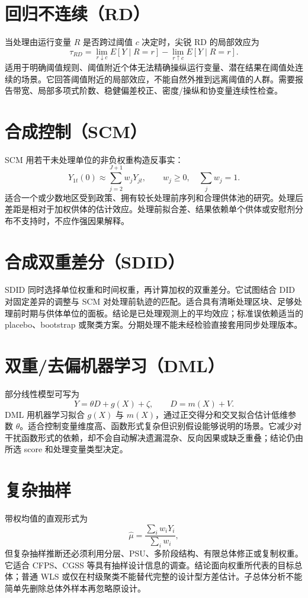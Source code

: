\documentclass[UTF8]{ctexart}
\begin{document}
\section{回归不连续（RD）}

当处理由运行变量 $R$ 是否跨过阈值 $c$ 决定时，尖锐 RD 的局部效应为
\[
\tau_{RD}=\lim_{r\downarrow c}E[Y\mid R=r]-\lim_{r\uparrow c}E[Y\mid R=r].
\]
适用于明确阈值规则、阈值附近个体无法精确操纵运行变量、潜在结果在阈值处连续的场景。它回答阈值附近的局部效应，不能自然外推到远离阈值的人群。需要报告带宽、局部多项式阶数、稳健偏差校正、密度/操纵和协变量连续性检查。

\section{合成控制（SCM）}

SCM 用若干未处理单位的非负权重构造反事实：
\[
Y_{1t}(0)\approx\sum_{j=2}^{J+1}w_jY_{jt},\qquad w_j\geq0,\quad\sum_jw_j=1.
\]
适合一个或少数地区受到政策、拥有较长处理前序列和合理供体池的研究。处理后差距是相对于加权供体的估计效应。处理前拟合差、结果依赖单个供体或安慰剂分布不支持时，不应作强因果解释。

\section{合成双重差分（SDID）}

SDID 同时选择单位权重和时间权重，再计算加权的双重差分。它试图结合 DID 对固定差异的调整与 SCM 对处理前轨迹的匹配。适合具有清晰处理区块、足够处理前时期与供体单位的面板。结论是已处理观测上的平均效应；标准误依赖适当的 placebo、bootstrap 或聚类方案。分期处理不能未经检验直接套用同步处理版本。

\section{双重/去偏机器学习（DML）}

部分线性模型可写为
\[
Y=\theta D+g(X)+\zeta,\qquad D=m(X)+V.
\]
DML 用机器学习拟合 $g(X)$ 与 $m(X)$，通过正交得分和交叉拟合估计低维参数 $\theta$。适合控制变量维度高、函数形式复杂但识别假设能够说明的场景。它减少对干扰函数形式的依赖，却不会自动解决遗漏混杂、反向因果或缺乏重叠；结论仍由所选 score 和处理变量类型决定。

\section{复杂抽样}

带权均值的直观形式为
\[
\widehat{\mu}=\frac{\sum_iw_iY_i}{\sum_iw_i},
\]
但复杂抽样推断还必须利用分层、PSU、多阶段结构、有限总体修正或复制权重。它适合 CFPS、CGSS 等具有抽样设计信息的调查。结论面向权重所代表的目标总体；普通 WLS 或仅在村级聚类不能替代完整的设计型方差估计。子总体分析不能简单先删除总体外样本再忽略原设计。
\end{document}
